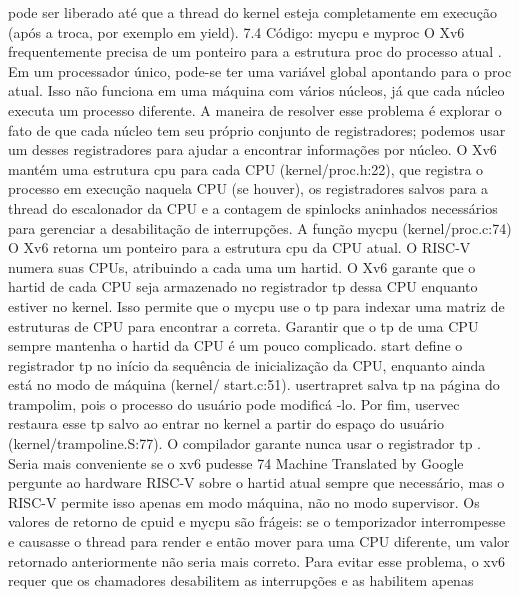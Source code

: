 pode  ser  liberado  até  que  a  thread  do  kernel  esteja  completamente  em  execução  (após  a  troca,  por  exemplo  em  yield).
 7.4  Código:  mycpu  e  myproc
 O  Xv6  frequentemente  precisa  de  um  ponteiro  para  a  estrutura  proc  do  processo  atual .  Em  um  processador  único,  pode-se  
ter  uma  variável  global  apontando  para  o  proc  atual.  Isso  não  funciona  em  uma  máquina  com  vários  núcleos,  já  que  cada  
núcleo  executa  um  processo  diferente.  A  maneira  de  resolver  esse  problema  é  explorar  o  fato  de  que  cada  núcleo  tem  seu  
próprio  conjunto  de  registradores;  podemos  usar  um  desses  registradores  para  ajudar  a  encontrar  informações  por  núcleo.
 O  Xv6  mantém  uma  estrutura  cpu  para  cada  CPU  (kernel/proc.h:22),  que  registra  o  processo  em  execução  naquela  
CPU  (se  houver),  os  registradores  salvos  para  a  thread  do  escalonador  da  CPU  e  a  contagem  de  spinlocks  aninhados  
necessários  para  gerenciar  a  desabilitação  de  interrupções.  A  função  mycpu  (kernel/proc.c:74)  O  Xv6  retorna  um  ponteiro  
para  a  estrutura  cpu  da  CPU  atual.  O  RISC-V  numera  suas  CPUs,  atribuindo  a  cada  uma  um  hartid.  O  Xv6  garante  que  o  
hartid  de  cada  CPU  seja  armazenado  no  registrador  tp  dessa  CPU  enquanto  estiver  no  kernel.
 Isso  permite  que  o  mycpu  use  o  tp  para  indexar  uma  matriz  de  estruturas  de  CPU  para  encontrar  a  correta.
 Garantir  que  o  tp  de  uma  CPU  sempre  mantenha  o  hartid  da  CPU  é  um  pouco  complicado.  start  define  o  
registrador  tp  no  início  da  sequência  de  inicialização  da  CPU,  enquanto  ainda  está  no  modo  de  máquina  (kernel/
 start.c:51).  usertrapret  salva  tp  na  página  do  trampolim,  pois  o  processo  do  usuário  pode  modificá  -lo.  Por  fim,  
uservec  restaura  esse  tp  salvo  ao  entrar  no  kernel  a  partir  do  espaço  do  usuário  (kernel/trampoline.S:77).
 O  compilador  garante  nunca  usar  o  registrador  tp .  Seria  mais  conveniente  se  o  xv6  pudesse
 74
Machine Translated by Google
 pergunte  ao  hardware  RISC-V  sobre  o  hartid  atual  sempre  que  necessário,  mas  o  RISC-V  permite  isso  apenas  em
 modo  máquina,  não  no  modo  supervisor.
 Os  valores  de  retorno  de  cpuid  e  mycpu  são  frágeis:  se  o  temporizador  interrompesse  e  causasse  o
 thread  para  render  e  então  mover  para  uma  CPU  diferente,  um  valor  retornado  anteriormente  não  seria  mais
 correto.  Para  evitar  esse  problema,  o  xv6  requer  que  os  chamadores  desabilitem  as  interrupções  e  as  habilitem  apenas
